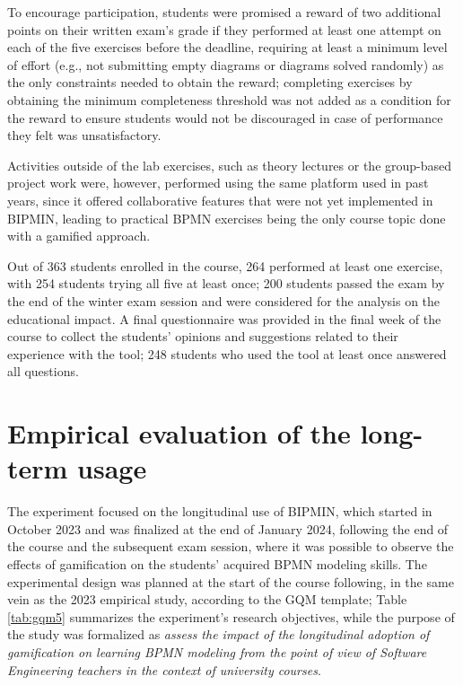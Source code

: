To encourage participation, students were promised a reward of two additional points on their written exam's grade if they performed at least one attempt on each of the five exercises before the deadline, requiring at least a minimum level of effort (e.g., not submitting empty diagrams or diagrams solved randomly) as the only constraints needed to obtain the reward; completing exercises by obtaining the minimum completeness threshold was not added as a condition for the reward to ensure students would not be discouraged in case of performance they felt was unsatisfactory. 

Activities outside of the lab exercises, such as theory lectures or the group-based project work were, however, performed using the same platform used in past years, since it offered collaborative features that were not yet implemented in BIPMIN, leading to practical BPMN exercises being the only course topic done with a gamified approach.

Out of 363 students enrolled in the course, 264 performed at least one exercise, with 254 students trying all five at least once; 200 students passed the exam by the end of the winter exam session and were considered for the analysis on the educational impact. A final questionnaire was provided in the final week of the course to collect the students' opinions and suggestions related to their experience with the tool; 248 students who used the tool at least once answered all questions.


\section{Empirical evaluation of the long-term usage}

The experiment focused on the longitudinal use of BIPMIN, which started in October 2023 and was finalized at the end of January 2024, following the end of the course and the subsequent exam session, where it was possible to observe the effects of gamification on the students' acquired BPMN modeling skills. The experimental design was planned at the start of the course following, in the same vein as the 2023 empirical study, according to the GQM template; Table \ref{tab:gqm5} summarizes the experiment's research objectives, while the purpose of the study was formalized as \textit{assess the impact of the longitudinal adoption of gamification on learning BPMN modeling from the point of view of Software Engineering teachers in the context of university courses}.

